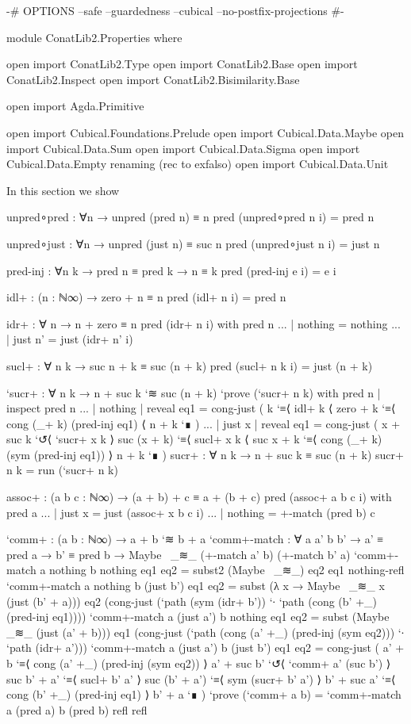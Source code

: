 \begin{code}[hide]
{-# OPTIONS --safe --guardedness --cubical --no-postfix-projections #-}

module ConatLib2.Properties where

open import ConatLib2.Type
open import ConatLib2.Base
open import ConatLib2.Inspect
open import ConatLib2.Bisimilarity.Base

open import Agda.Primitive

open import Cubical.Foundations.Prelude
open import Cubical.Data.Maybe
open import Cubical.Data.Sum
open import Cubical.Data.Sigma
open import Cubical.Data.Empty
  renaming (rec to exfalso)
open import Cubical.Data.Unit
\end{code}

In this section we show

\begin{code}[hide]
unpred∘pred : ∀{n} → unpred (pred n) ≡ n
pred (unpred∘pred {n} i) = pred n

unpred∘just : ∀{n} → unpred (just n) ≡ suc n
pred (unpred∘just {n} i) = just n

pred-inj : ∀{n k} → pred n ≡ pred k → n ≡ k
pred (pred-inj e i) = e i

idl+ : (n : ℕ∞) → zero + n ≡ n
pred (idl+ n i) = pred n

idr+ : ∀ n → n + zero ≡ n
pred (idr+ n i) with pred n
... | nothing = nothing
... | just n' = just (idr+ n' i)

sucl+ : ∀ n k → suc n + k ≡ suc (n + k)
pred (sucl+ n k i) = just (n + k)

`sucr+ : ∀ n k → n + suc k `≋ suc (n + k)
`prove (`sucr+ n k) with pred n | inspect pred n
... | nothing | reveal eq1 = cong-just (
  k
    `≡⟨ idl+ k ⟨
  zero + k
    `≡⟨ cong (_+ k) (pred-inj eq1) ⟨
  n + k `∎
  )
... | just x  | reveal eq1 = cong-just (
  x + suc k
    `↺⟨ `sucr+ x k ⟩
  suc (x + k)
    `≡⟨ sucl+ x k ⟨
  suc x + k
    `≡⟨ cong (_+ k) (sym (pred-inj eq1)) ⟩
  n + k `∎
  )
sucr+ : ∀ n k → n + suc k ≡ suc (n + k)
sucr+ n k = run (`sucr+ n k)

assoc+ : (a b c : ℕ∞) → (a + b) + c ≡ a + (b + c)
pred (assoc+ a b c i) with pred a
... | just x = just (assoc+ x b c i)
... | nothing = +-match (pred b) c

`comm+ : (a b : ℕ∞) → a + b `≋ b + a
`comm+-match : ∀ a a' b b' → a' ≡ pred a → b' ≡ pred b → Maybe~ _≋_ (+-match a' b) (+-match b' a)
`comm+-match a nothing b nothing eq1 eq2 = subst2 (Maybe~ _≋_) eq2 eq1 nothing-refl
`comm+-match a nothing b (just b') eq1 eq2 = subst (λ x → Maybe~ _≋_ x (just (b' + a))) eq2 (cong-just (`path (sym (idr+ b')) `∙ `path (cong (b' +_) (pred-inj eq1))))
`comm+-match a (just a') b nothing eq1 eq2 = subst (Maybe~ _≋_ (just (a' + b))) eq1 (cong-just (`path (cong (a' +_) (pred-inj (sym eq2))) `∙ `path (idr+ a')))
`comm+-match a (just a') b (just b') eq1 eq2 = cong-just (
  a' + b
    `≡⟨ cong (a' +_) (pred-inj (sym eq2)) ⟩
  a' + suc b'
    `↺⟨ `comm+ a' (suc b') ⟩
  suc b' + a'
    `≡⟨ sucl+ b' a' ⟩
  suc (b' + a')
    `≡⟨ sym (sucr+ b' a') ⟩
  b' + suc a'
    `≡⟨ cong (b' +_) (pred-inj eq1) ⟩
  b' + a `∎
  )
`prove (`comm+ a b) = `comm+-match a (pred a) b (pred b) refl refl
\end{code}
